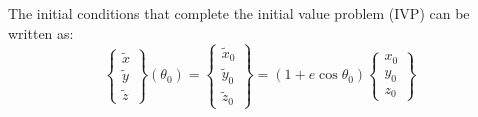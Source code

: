	\indent The initial conditions that complete the initial value problem (IVP) can be written as:
	\[
	\left\{\begin{array}{c}
	\widetilde{x} \\
	\widetilde{y} \\
	\widetilde{z} 
	\end{array}\right\}(\theta_0) = 
	\left\{\begin{array}{c}
	\widetilde{x}_0 \\
	\widetilde{y}_0 \\
	\widetilde{z}_0 	
	\end{array}\right\}
	= (1 + e\cos\theta_0) 
	\left\{\begin{array}{c}
	x_0 \\
	y_0 \\
	z_0 
	\end{array}\right\}
	\]
